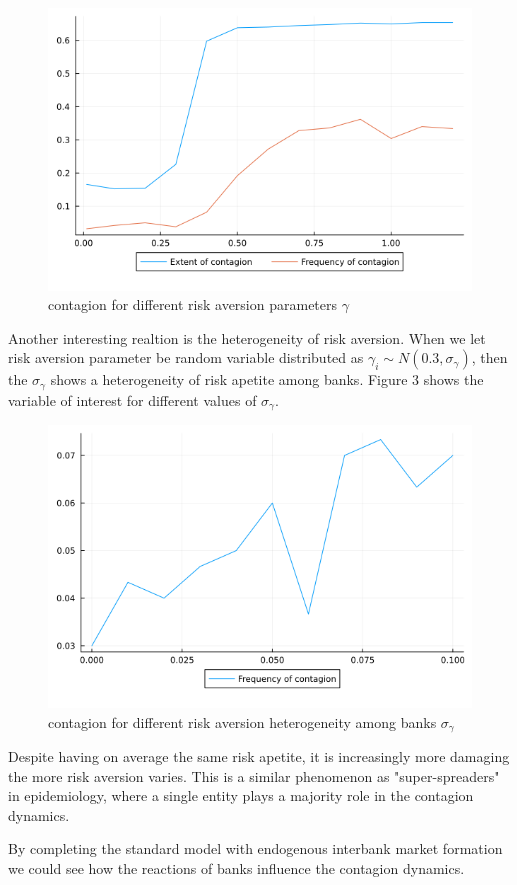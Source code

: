 \documentclass{article}
\begin{document}
\begin{figure}[ht]
  \centering
  \includegraphics[scale=0.5]{contagionplot_optim.png}
  \caption{contagion for different risk aversion parameters $\gamma$}
\end{figure}

Another interesting realtion is the heterogeneity of risk aversion. When we let risk aversion parameter be random variable distributed as $\gamma_i \sim N(0.3, \sigma_{\gamma})$, then the $\sigma_{\gamma}$ shows a heterogeneity of risk apetite among banks. Figure 3 shows the variable of interest for different values of $\sigma_{\gamma}$. 

\begin{figure}[h]
  \centering
  \includegraphics[scale=0.6]{contagion_freq1.png}
  \caption{contagion for different risk aversion heterogeneity among banks $\sigma_{\gamma}$}
\end{figure}

Despite having on average the same risk apetite, it is increasingly more damaging the more risk aversion varies. This is a similar phenomenon as "super-spreaders" in epidemiology, where a single entity plays a majority role in the contagion dynamics. 

By completing the standard model with endogenous interbank market formation we could see how the reactions of banks influence the contagion dynamics. 

\medskip

\newpage


\end{document}
